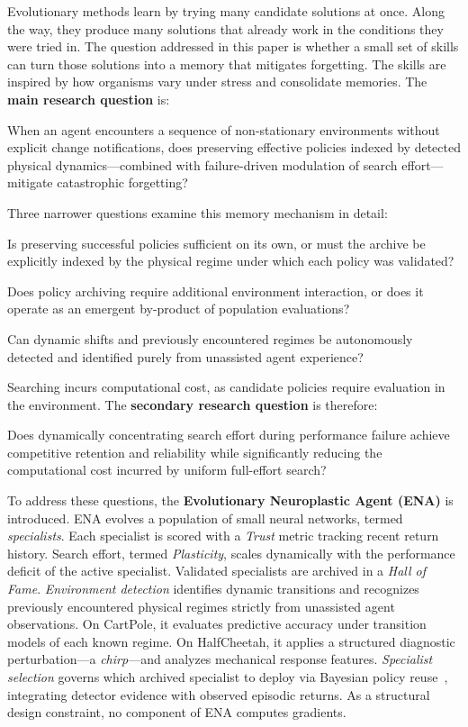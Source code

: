 Evolutionary methods learn by trying many candidate solutions at once. Along the way, they produce many solutions that already work in the conditions they were tried in. The question addressed in this paper is whether a small set of skills can turn those solutions into a memory that mitigates forgetting. The skills are inspired by how organisms vary under stress and consolidate memories. The \textbf{main research question} is:
\begin{rqlist}
\item[\textbf{RQ1}] When an agent encounters a sequence of non-stationary environments without explicit change notifications, does preserving effective policies indexed by detected physical dynamics---combined with failure-driven modulation of search effort---mitigate catastrophic forgetting?
\end{rqlist}
Three narrower questions examine this memory mechanism in detail:
\begin{rqlist}
\item[\textbf{RQ1a}] Is preserving successful policies sufficient on its own, or must the archive be explicitly indexed by the physical regime under which each policy was validated?
\item[\textbf{RQ1b}] Does policy archiving require additional environment interaction, or does it operate as an emergent by-product of population evaluations?
\item[\textbf{RQ1c}] Can dynamic shifts and previously encountered regimes be autonomously detected and identified purely from unassisted agent experience?
\end{rqlist}
Searching incurs computational cost, as candidate policies require evaluation in the environment. The \textbf{secondary research question} is therefore:
\begin{rqlist}
\item[\textbf{RQ2}] Does dynamically concentrating search effort during performance failure achieve competitive retention and reliability while significantly reducing the computational cost incurred by uniform full-effort search?
\end{rqlist}

To address these questions, the \textbf{Evolutionary Neuroplastic Agent (ENA)} is introduced. ENA evolves a population of small neural networks, termed \textit{specialists}. Each specialist is scored with a \textit{Trust} metric tracking recent return history. Search effort, termed \textit{Plasticity}, scales dynamically with the performance deficit of the active specialist. Validated specialists are archived in a \textit{Hall of Fame}. \textit{Environment detection} identifies dynamic transitions and recognizes previously encountered physical regimes strictly from unassisted agent observations. On CartPole, it evaluates predictive accuracy under transition models of each known regime. On HalfCheetah, it applies a structured diagnostic perturbation---a \textit{chirp}---and analyzes mechanical response features. \textit{Specialist selection} governs which archived specialist to deploy via Bayesian policy reuse~\citep{rosman2016bayesian}, integrating detector evidence with observed episodic returns. As a structural design constraint, no component of ENA computes gradients.

